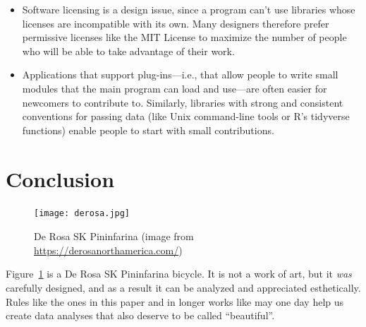 \documentclass[10pt,letterpaper]{article}
\begin{document}
\begin{itemize}

\item
  Software licensing is a design issue,
  since a program can't use libraries whose licenses are incompatible with its own.
  Many designers therefore prefer permissive licenses like the MIT License
  to maximize the number of people who will be able to take advantage of their work.

\item
  Applications that support plug-ins---i.e.,
  that allow people to write small modules that the main program can load and use---are
  often easier for newcomers to contribute to.
  Similarly,
  libraries with strong and consistent conventions for passing data
  (like Unix command-line tools or R's tidyverse functions)
  enable people to start with small contributions.

\end{itemize}

\section*{Conclusion}

\begin{figure}
  \centering
  \texttt{[image: derosa.jpg]}
  \caption{De Rosa SK Pininfarina (image from \url{https://derosanorthamerica.com/})}
  \label{bicycle}
\end{figure}

Figure~\ref{bicycle} is a De Rosa SK Pininfarina bicycle.
It is not a work of art,
but it \emph{was} carefully designed,
and as a result it can be analyzed and appreciated esthetically.
Rules like the ones in this paper
and in longer works like \cite{Budgen2020}
may one day help us create data analyses that also deserve to be called ``beautiful''.


\end{document}

